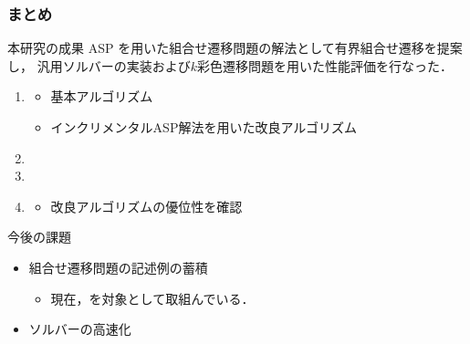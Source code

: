 \documentclass[dvipdfmx,11pt]{beamer}
\begin{document}
\begin{frame}\frametitle{まとめ}

  \begin{alertblock}{本研究の成果}\centering
    ASP を用いた組合せ遷移問題の解法として有界組合せ遷移を提案し，
    汎用ソルバーの実装および$k$彩色遷移問題を用いた性能評価を行なった．
  \end{alertblock}

  \begin{enumerate}
  \item {}
    \begin{itemize}
    \item 基本アルゴリズム
    \item インクリメンタルASP解法を用いた改良アルゴリズム
    \end{itemize}
  \item {}
  \item {}
  \item {}
    \begin{itemize}
    \item 改良アルゴリズムの優位性を確認
    \end{itemize}
  \end{enumerate}
  
  \begin{exampleblock}{今後の課題}
    \begin{itemize}
      \item 組合せ遷移問題の記述例の蓄積
        \begin{itemize}
          \item 現在，を対象として取組んでいる．
        \end{itemize}
      \item ソルバーの高速化
    \end{itemize}
  \end{exampleblock}
\end{frame}

\end{document}
